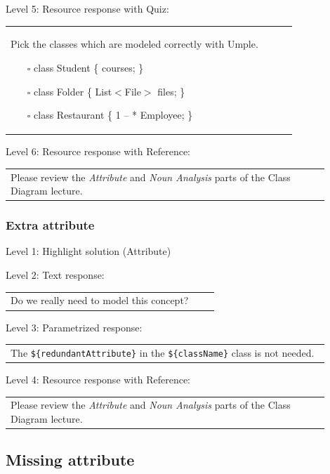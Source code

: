 \noindent Level 5: Resource response with Quiz: \medskip

\begin{tabular}{|p{0.9\linewidth}}
Pick the classes which are modeled correctly with Umple.

\begin{itemize}
    \item[$\square$] class Student \{ courses; \}
    \item[$\square$] class Folder \{ List$<$File$>$ files; \}
    \item[$\square$] class Restaurant \{ 1 -- * Employee; \}
\end{itemize}

\end{tabular} \medskip

\noindent Level 6: Resource response with Reference: \medskip

\begin{tabular}{|p{0.9\linewidth}}
Please review the \textit{Attribute} and \textit{Noun Analysis} parts of the Class Diagram lecture.
\end{tabular} \medskip


\subsubsection{Extra attribute}

\noindent Level 1: Highlight solution (Attribute) \medskip

\noindent Level 2: Text response: \medskip

\begin{tabular}{|p{0.9\linewidth}}
Do we really need to model this concept?
\end{tabular} \medskip

\noindent Level 3: Parametrized response: \medskip

\begin{tabular}{|p{0.9\linewidth}}
The \verb|${redundantAttribute}| in the \verb|${className}| class is not needed.
\end{tabular} \medskip

\noindent Level 4: Resource response with Reference: \medskip

\begin{tabular}{|p{0.9\linewidth}}
Please review the \textit{Attribute} and \textit{Noun Analysis} parts of the Class Diagram lecture.
\end{tabular} \medskip


\subsection{Missing attribute}

